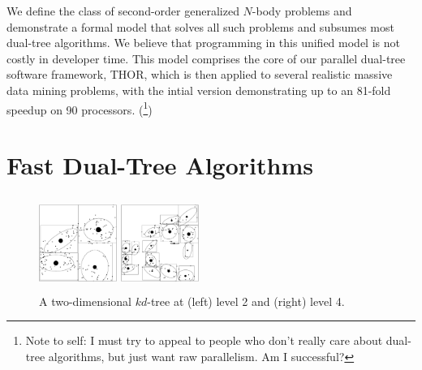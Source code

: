 \documentclass[twoside,leqno,twocolumn]{article}
\newcommand{\authornote}[1]{(\footnote{Note to self: #1})}
\newcommand{\authorsnote}[1]{\authornote{#1}}
\begin{document}
We define the class of second-order generalized $N$-body problems and demonstrate a formal model that solves all such problems and subsumes most dual-tree algorithms.
We believe that programming in this unified model is not costly in developer time.
This model comprises the core of our parallel dual-tree software framework, THOR, which is then applied to several realistic massive data mining problems, with the intial version demonstrating up to an 81-fold speedup on 90 processors.
\authorsnote{I must try to appeal to people who don't really care about dual-tree algorithms, but just want raw parallelism.  Am I successful?}

\section{Fast Dual-Tree Algorithms}

\begin{figure}[t]
  \centering
  \begin{minipage}{3.2in}
    \begin{minipage}{1.05in}
      \includegraphics[width=1.0in,height=1.2in]{kdtree-level2.ps}
    \end{minipage}
    \begin{minipage}{1.05in}
      \includegraphics[width=1.0in,height=1.2in]{kdtree-level4.ps}
    \end{minipage}
    \begin{minipage}{1.0in}
      \footnotesize{\caption{\label{fig:kdtree} A two-dimensional
          $kd$-tree at (left) level 2 and (right) level 4.}}
    \end{minipage}
  \end{minipage}
\end{figure}
\end{document}
